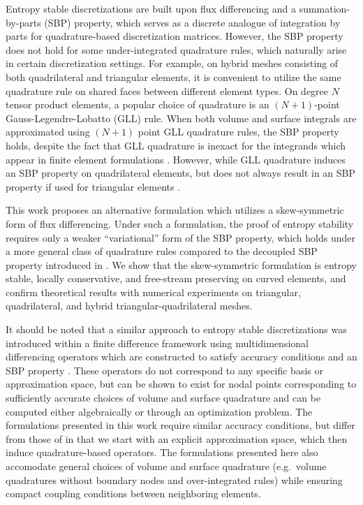 \documentclass{svjour3}                     %
\begin{document}
Entropy stable discretizations are built upon flux differencing and a summation-by-parts (SBP) property, which serves as a discrete analogue of integration by parts for quadrature-based discretization matrices.  However, the SBP property does not hold for some under-integrated quadrature rules, which naturally arise in certain discretization settings.  For example, on hybrid meshes consisting of both quadrilateral and triangular elements, it is convenient to utilize the same quadrature rule on shared faces between different element types.  On degree $N$ tensor product elements, a popular choice of quadrature is an $(N+1)$-point Gauss-Legendre-Lobatto (GLL) rule.  When both volume and surface integrals are approximated using $(N+1)$ point GLL quadrature rules, the SBP property holds, despite the fact that GLL quadrature is inexact for the integrands which appear in finite element formulations \cite{fisher2013high}.  However, while GLL quadrature induces an SBP property on quadrilateral elements, but does not always result in an SBP property if used for triangular elements \cite{chan2017discretely}.  %

This work proposes an alternative formulation which utilizes a skew-symmetric form of flux differencing.  Under such a formulation, the proof of entropy stability requires only a weaker ``variational'' form of the SBP property, which holds under a more general class of quadrature rules compared to the decoupled SBP property introduced in \cite{chan2017discretely, chan2018discretely}.  We show that the skew-symmetric formulation is entropy stable, locally conservative, and free-stream preserving on curved elements, and confirm theoretical results with numerical experiments on triangular, quadrilateral, and hybrid triangular-quadrilateral meshes.  

It should be noted that a similar approach to entropy stable discretizations was introduced within a finite difference framework \cite{chen2017entropy, crean2018entropy} using multidimensional differencing operators which are constructed to satisfy accuracy conditions and an SBP property \cite{hicken2016multidimensional}.  These operators do not correspond to any specific basis or approximation space, but can be shown to exist for nodal points corresponding to sufficiently accurate choices of volume and surface quadrature and can be computed either algebraically or through an optimization problem.  The formulations presented in this work require similar accuracy conditions, but differ from those of \cite{chen2017entropy, crean2018entropy} in that we start with an explicit approximation space, which then induce quadrature-based operators.  The formulations presented here also accomodate general choices of volume and surface quadrature (e.g.\ volume quadratures without boundary nodes and over-integrated rules) while ensuring compact coupling conditions between neighboring elements.  
\end{document}
